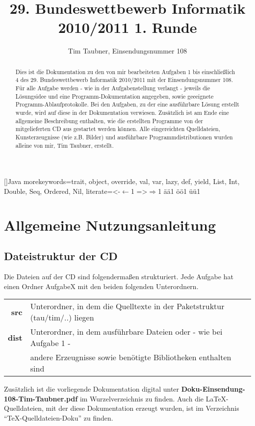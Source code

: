\documentclass[a4paper,11pt]{scrartcl}
\title{29. Bundeswettbewerb Informatik 2010/2011 1. Runde}
\author{Tim Taubner, Einsendungsnummer 108}
\begin{document}
\addtolength{\hoffset}{-0.2cm}
\addtolength{\voffset}{-1.6cm}
\addtolength{\textheight}{2cm}

\maketitle

\begin{abstract}
 Dies ist die Dokumentation zu den von mir bearbeiteten Aufgaben 1 bis einschließlich 4 des 29.
Bundeswettbewerb Informatik 2010/2011 mit der Einsendungsnummer 108.
 Für alle Aufgabe werden - wie in der Aufgabenstellung verlangt - jeweils die Lösungsidee und eine Programm-Dokumentation angegeben,
 sowie geeeignete Programm-Ablaufprotokolle.
 Bei den Aufgaben, zu der eine ausführbare Lösung erstellt wurde, wird auf diese in der Dokumentation verwiesen.
 Zusätzlich ist am Ende eine allgemeine Beschreibung enthalten, wie die erstellten Programme von der mitgelieferten CD aus gestartet werden können.
 Alle eingereichten Quelldateien, Kunsterzeugnisse (wie z.B. Bilder) und ausführbare Programmdistributionen
 wurden alleine von mir, Tim Taubner, erstellt.
\end{abstract}
\newpage
\tableofcontents

[]{Java}
  {morekeywords={trait, object, override, val, var, lazy, def, yield, List, Int, Double, Seq, Ordered, Nil},
   literate={<-}{{$\gets$}}1 {=>}{{$\Rightarrow$}}1 {ä}{{\"a}}1 {ö}{{\"o}}1 {ü}{{\"u}}1}






\section{Allgemeine Nutzungsanleitung}
\subsection{Dateistruktur der CD}
Die Dateien auf der CD sind folgendermaßen strukturiert.
Jede Aufgabe hat einen Ordner AufgabeX mit den beiden folgenden Unterordnern.\\
\begin{tabular}{rl}
\textbf{src} & Unterordner, in dem die Quelltexte in der Paketstruktur (tau/tim/..) liegen \\
\textbf{dist} & Unterordner, in dem ausführbare Dateien oder - wie bei Aufgabe 1 - \\
              & andere Erzeugnisse sowie benötigte Bibliotheken enthalten sind \\
\end{tabular}
\newline
Zusätzlich ist die vorliegende Dokumentation digital unter \textbf{Doku-Einsendung-108-Tim-Taubner.pdf} im Wurzelverzeichnis zu finden.
Auch die \LaTeX-Quelldateien, mit der diese Dokumentation erzeugt wurden, ist im Verzeichnis ``TeX-Quelldateien-Doku'' zu finden.
\end{document}
